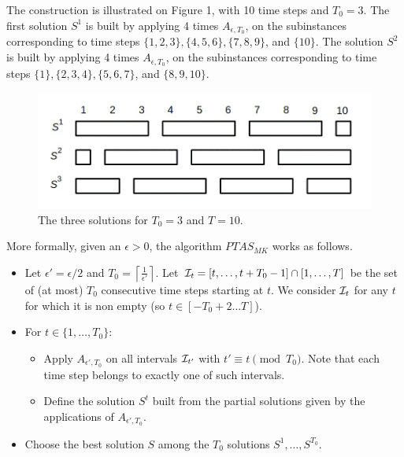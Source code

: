 \documentclass[a4paper]{book}
\begin{document}

The construction is illustrated on Figure 1, with 10 time steps and $T_0 = 3$. The first
solution $S^1$ is built by applying 4 times $A_{\epsilon,T_0}$, on the subinstances corresponding to time
steps $\{1, 2, 3\}, \{4, 5, 6\}, \{7, 8, 9\}$, and $\{10\}$. The 
solution $S^2$ is built by applying 4 times $A_{\epsilon,T_0}$, on the subinstances corresponding to time
steps $\{1\}, \{2, 3, 4\}, \{5, 6, 7\}$, and $\{8,9, 10\}$.


\begin{figure}[ht]
\begin{center}
\includegraphics[scale=0.5]{slidingwindow2.jpg}
\caption{The three solutions for $T_0=3$ and $T=10$.}\label{fig:solutions}
\end{center}
\end{figure}


More formally, given an $\epsilon>0$, the algorithm $PTAS_{MK}$ works as follows.
\begin{itemize}
\item Let $\epsilon'=\epsilon/2$ and $T_0=\left\lceil \frac{1}{\epsilon'}\right\rceil$. Let ${\cal I}_t=[t,\dots, t+T_0-1] \cap [1, \dots, T]$ be the  set of (at most) $T_0$ consecutive time steps starting at $t$. We consider ${\cal I}_t$ for any $t$ for which it is non empty (so $t\in [-T_0+2 \dots T]$).%
\item For $t \in \{1, \ldots, T_0 \}$:
\begin{itemize}
    \item Apply $A_{\epsilon',T_0}$ on all intervals ${\cal I}_{t'}$ with $t'\equiv t \pmod{T_0}$.
    Note that each time step belongs to exactly one of such intervals. %
    \item Define the solution $S^t$ built from the partial solutions given by the applications of $A_{\epsilon'\textbf{},T_0}$.
\end{itemize}
\item Choose the best solution $S$ among the $T_0$ solutions $S^1,\dots,S^{T_0}$.
\end{itemize} 
\end{document}
